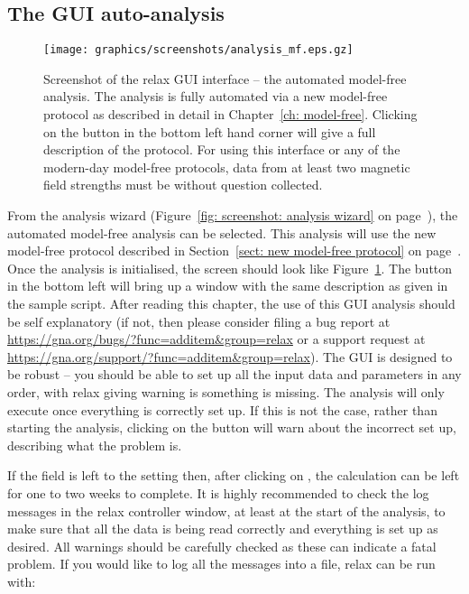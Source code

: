 \begin{htmlonly}
\begin{htmlonly}

\section{The GUI auto-analysis}

\begin{figure}
\centerline{\texttt{[image: graphics/screenshots/analysis\_mf.eps.gz]}}
\caption[GUI screenshot -- Model-free analysis]{Screenshot of the relax GUI interface -- the automated model-free analysis.  The analysis is fully automated via a new model-free protocol as described in detail in Chapter~\ref{ch: model-free}.  Clicking on the  button in the bottom left hand corner will give a full description of the protocol.  For using this interface or any of the modern-day model-free protocols, data from at least two magnetic field strengths must be without question collected.}\label{fig: screenshot: model-free analysis}
\end{figure}

From the analysis wizard (Figure~\ref{fig: screenshot: analysis wizard} on page~\pageref{fig: screenshot: analysis wizard}), the automated model-free analysis can be selected.  This analysis will use the new model-free protocol described in Section~\ref{sect: new model-free protocol} on page~\pageref{sect: new model-free protocol}.  Once the analysis is initialised, the screen should look like Figure~\ref{fig: screenshot: model-free analysis}.  The  button in the bottom left will bring up a window with the same description as given in the sample script.  After reading this chapter, the use of this GUI analysis should be self explanatory (if not, then please consider filing a bug report at \href{https://gna.org/bugs/?func=additem\&group=relax}{https://gna.org/bugs/?func=additem\&group=relax} or a support request at \href{https://gna.org/support/?func=additem\&group=relax}{https://gna.org/support/?func=additem\&group=relax}).  The GUI is designed to be robust -- you should be able to set up all the input data and parameters in any order, with relax giving warning is something is missing.  The analysis will only execute once everything is correctly set up.  If this is not the case, rather than starting the analysis, clicking on the  button will warn about the incorrect set up, describing what the problem is.

If the  field is left to the  setting then, after clicking on , the calculation can be left for one to two weeks to complete.  It is highly recommended to check the log messages in the relax controller window, at least at the start of the analysis, to make sure that all the data is being read correctly and everything is set up as desired.  All warnings should be carefully checked as these can indicate a fatal problem.  If you would like to log all the messages into a file, relax can be run with:


\end{htmlonly}
\end{htmlonly}
